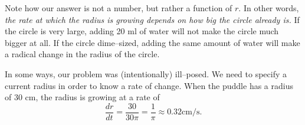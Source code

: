 {\begin{enumerate}
Note how our answer is not a number, but rather a function of $r$. In other words, \textit{the rate at which the radius is growing depends on how big the circle already is.} If the circle is very large, adding 20 ml of water will not make the circle much bigger at all. If the circle dime--sized, adding the same amount of water will make a radical change in the radius of the circle.

In some ways, our problem was (intentionally) ill--posed. We need to specify a current radius in order to know a rate of change. When the puddle has a radius of 30 cm, the radius is growing at a rate of 
\[
\frac{dr}{dt} = \frac{30}{30\pi} = \frac{1}{\pi} \approx 0.32\text{cm/s}.
\]
 
\end{enumerate}
}\\

\medskip

